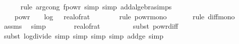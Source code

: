 \begin{isabellebody}
\ \ \ \ \isamarkupfalse%
\ {\isacharparenleft}{\kern0pt}rule\ arg{\isacharunderscore}{\kern0pt}cong{}{\isacharbrackleft}{\kern0pt}\ f{\isacharequal}{\kern0pt}{\isachardoublequoteopen}{\isacharparenleft}{\kern0pt}powr{\isacharparenright}{\kern0pt}{\isachardoublequoteclose}{\isacharbrackright}{\kern0pt}{\isacharcomma}{\kern0pt}\ simp{\isacharcomma}{\kern0pt}\ simp\ add{\isacharcolon}{\kern0pt}algebra{\isacharunderscore}{\kern0pt}simps{\isacharparenright}{\kern0pt}\isanewline
\ \ \isamarkupfalse%
\ \isamarkupfalse%
\ {\isachardoublequoteopen}{\isachardot}{\kern0pt}{\isachardot}{\kern0pt}{\isachardot}{\kern0pt}\ {\isasymle}\ {}\ powr\ {\isacharparenleft}{\kern0pt}\ {\isacharminus}{\kern0pt}{}\ {\isacharasterisk}{\kern0pt}\ log\ {}\ {\isacharparenleft}{\kern0pt}{}\ {\isacharslash}{\kern0pt}real{\isacharunderscore}{\kern0pt}of{\isacharunderscore}{\kern0pt}rat\ {\isasymdelta}{\isacharparenright}{\kern0pt}\ {\isacharminus}{\kern0pt}{}{\isacharparenright}{\kern0pt}{\isachardoublequoteclose}\isanewline
\ \ \ \ \isamarkupfalse%
\ {\isacharparenleft}{\kern0pt}rule\ powr{\isacharunderscore}{\kern0pt}mono{\isacharparenright}{\kern0pt}\isanewline
\ \ \ \ \ \isamarkupfalse%
\ {\isacharparenleft}{\kern0pt}rule\ diff{\isacharunderscore}{\kern0pt}mono{\isacharparenright}{\kern0pt}\isanewline
\ \ \ \ \isamarkupfalse%
\ assms{\isacharparenleft}{\kern0pt}{}{\isacharparenright}{\kern0pt}\ \isamarkupfalse%
\ simp{\isacharplus}{\kern0pt}\isanewline
\ \ \isamarkupfalse%
\ \isamarkupfalse%
\ {\isachardoublequoteopen}{\isachardot}{\kern0pt}{\isachardot}{\kern0pt}{\isachardot}{\kern0pt}\ {\isacharequal}{\kern0pt}\ real{\isacharunderscore}{\kern0pt}of{\isacharunderscore}{\kern0pt}rat\ {\isasymdelta}\ {\isacharslash}{\kern0pt}\ {}{}{\isachardoublequoteclose}\isanewline
\ \ \ \ \isamarkupfalse%
\ {\isacharparenleft}{\kern0pt}subst\ powr{\isacharunderscore}{\kern0pt}diff{\isacharparenright}{\kern0pt}\isanewline
\ \ \ \ \isamarkupfalse%
\ {\isacharparenleft}{\kern0pt}subst\ log{\isacharunderscore}{\kern0pt}divide{\isacharcomma}{\kern0pt}\ simp{\isacharcomma}{\kern0pt}\ simp{\isacharcomma}{\kern0pt}\ simp{\isacharcomma}{\kern0pt}\ simp\ add{\isacharcolon}{\kern0pt}{\isasymdelta}{\isacharunderscore}{\kern0pt}ge{\isacharunderscore}{\kern0pt}{}{\isacharcomma}{\kern0pt}\ simp{\isacharparenright}{\kern0pt}\isanewline

\end{isabellebody}

